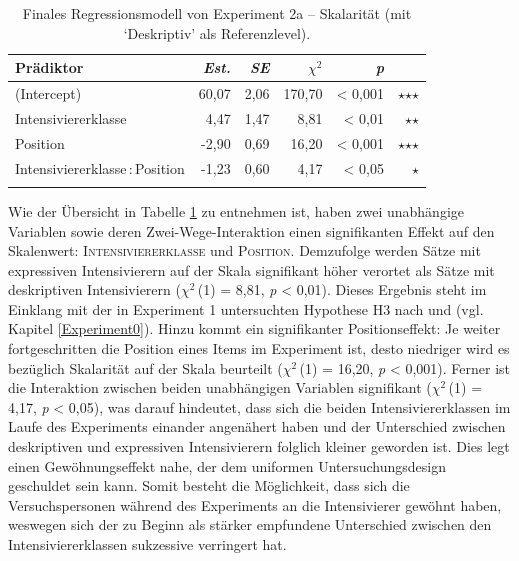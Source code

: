 %
\begin{table}
\begin{tabularx}{\textwidth}{Xrrrrr}
\lsptoprule
Prädiktor & \textit{Est.} & \textit{SE} & \textit{$\chi$$^{2}$} & \textit{p} & \\
\midrule

(Intercept) & 60,07 & 2,06 & 170,70 & < 0,001 & $\star$$\star$$\star$ \\
Intensiviererklasse & \textcolor{white}{-}4,47 & 1,47 & \textcolor{white}{-}\textcolor{white}{-}8,81 & < 0,01 & $\star$$\star$ \\
Position & -2,90 & 0,69 & \textcolor{white}{-}16,20 & < 0,001 & $\star$$\star$$\star$ \\
Intensiviererklasse\,:\,Position & -1,23 & 0,60 & \textcolor{white}{-}\textcolor{white}{-}4,17 & < 0,05 & \multicolumn{1}{r}{$\star$} \\
\lspbottomrule

\end{tabularx}
\caption[Finales Regressionsmodell von Experiment 2a (mit `Deskriptiv' als Referenzlevel)]{Finales Regressionsmodell von Experiment 2a -- Skalarität (mit `Deskriptiv' als Referenzlevel).}
\label{LinReg01}
\end{table}





\noindent Wie der Übersicht in Tabelle \ref{LinReg01} zu entnehmen ist, haben zwei unabhängige Variablen sowie deren Zwei-Wege-Interaktion einen signifikanten Effekt auf den Skalenwert: \textsc{Intensiviererklasse} und \textsc{Position}. Demzufolge werden Sätze mit expressiven Intensivierern auf der Skala signifikant höher verortet als Sätze mit deskriptiven Intensivierern ($\chi$$^{2}$\,(1) = 8,81, \textit{p} < 0,01). Dieses Ergebnis steht im Einklang mit der in Experiment 1 untersuchten Hypothese H3 nach \citet[22]{Paradis.1997} und \citet[133]{Gutzmann.2019a} (vgl. Kapitel \ref{Experiment0}). Hinzu kommt ein signifikanter Positionseffekt: Je weiter fortgeschritten die Position eines Items im Experiment ist, desto niedriger wird es bezüglich Skalarität auf der Skala beurteilt {($\chi$$^{2}$\,(1) = 16,20,} {\textit{p} < 0,001}). Ferner ist die Interaktion zwischen beiden unabhängigen Variablen signifikant ($\chi$$^{2}$\,(1) = 4,17, \textit{p} < 0,05), was darauf hindeutet, dass sich die beiden Intensiviererklassen im Laufe des Experiments einander angenähert haben und der Unterschied zwischen deskriptiven und expressiven Intensivierern folglich kleiner geworden ist. Dies legt einen Gewöhnungseffekt nahe, der dem uniformen Untersuchungsdesign geschuldet sein kann. Somit besteht die Möglichkeit, dass sich die Versuchspersonen während des Experiments an die Intensivierer gewöhnt haben, weswegen sich der zu Beginn als stärker empfundene Unterschied zwischen den Intensiviererklassen sukzessive verringert hat.


